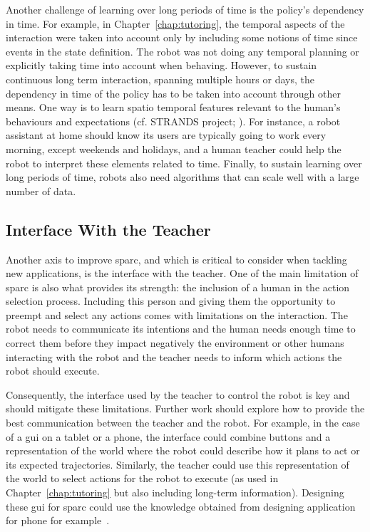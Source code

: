 Another challenge of learning over long periods of time is the policy's dependency in time. For example, in Chapter~\ref{chap:tutoring}, the temporal aspects of the interaction were taken into account only by including some notions of time since events in the state definition. The robot was not doing any temporal planning or explicitly taking time into account when behaving. However, to sustain continuous long term interaction, spanning multiple hours or days, the dependency in time of the policy has to be taken into account through other means. One way is to learn spatio temporal features relevant to the human's behaviours and expectations (cf. STRANDS project; \citealt{hawes2017strands}). For instance, a robot assistant at home should know its users are typically going to work every morning, except weekends and holidays, and a human teacher could help the robot to interpret these elements related to time. Finally, to sustain learning over long periods of time, robots also need algorithms that can scale well with a large number of data. 

\subsection{Interface With the Teacher}\label{sec:disc_future_interface}

Another axis to improve \gls{sparc}, and which is critical to consider when tackling new applications, is the interface with the teacher. One of the main limitation of \gls{sparc} is also what provides its strength: the inclusion of a human in the action selection process. Including this person and giving them the opportunity to preempt and select any actions comes with limitations on the interaction. The robot needs to communicate its intentions and the human needs enough time to correct them before they impact negatively the environment or other humans interacting with the robot and the teacher needs to inform which actions the robot should execute. 

Consequently, the interface used by the teacher to control the robot is key and should mitigate these limitations. Further work should explore how to provide the best communication between the teacher and the robot. For example, in the case of a \gls{gui} on a tablet or a phone, the interface could combine buttons and a representation of the world where the robot could describe how it plans to act or its expected trajectories. Similarly, the teacher could use this representation of the world to select actions for the robot to execute (as used in Chapter~\ref{chap:tutoring} but also including long-term information). Designing these \gls{gui} for \gls{sparc} could use the knowledge obtained from designing application for phone for example~\citep{joorabchi2013real}. 

